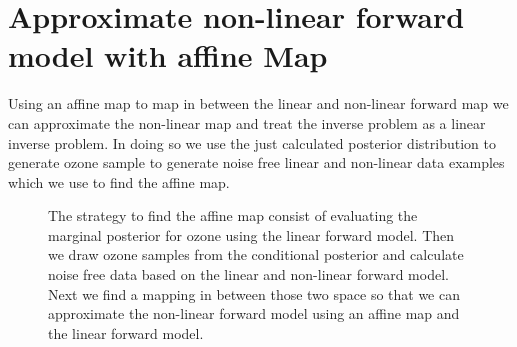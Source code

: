 \section{Approximate non-linear forward model with affine Map} 
\label{sec:affineMap}
Using an affine map to map in between the linear and non-linear forward map we can approximate the non-linear map and treat the inverse problem as a linear inverse problem.
In doing so we use the just calculated posterior distribution to generate ozone sample to generate noise free linear and non-linear data examples which we use to find the affine map.
\begin{figure}[htb!]
	\centering
\caption[Strategy to find affine map.]{The strategy to find the affine map consist of evaluating the marginal posterior for ozone using the linear forward model. Then we draw ozone samples from the conditional posterior and calculate noise free data based on the linear and non-linear forward model. Next we find a mapping in between those two space so that we can approximate the non-linear forward model using an affine map and the linear forward model.}
\end{figure}

